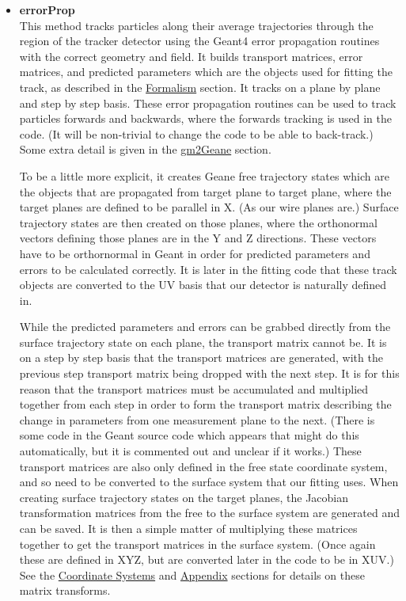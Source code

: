 \begin{enumerate}
\begin{itemize}
          \item{\bf{errorProp}} \\ 
          This method tracks particles along their average trajectories through the region of the tracker detector using the Geant4 error propagation routines with the correct geometry and field. It builds transport matrices, error matrices, and predicted parameters which are the objects used for fitting the track, as described in the \hyperref[sec:Formalism]{Formalism} section. It tracks on a plane by plane and step by step basis. These error propagation routines can be used to track particles forwards and backwards, where the forwards tracking is used in the code. (It will be non-trivial to change the code to be able to back-track.) Some extra detail is given in the \hyperref[sec:gm2Geane]{gm2Geane} section.

          To be a little more explicit, it creates Geane free trajectory states which are the objects that are propagated from target plane to target plane, where the target planes are defined to be parallel in X. (As our wire planes are.) Surface trajectory states are then created on those planes, where the orthonormal vectors defining those planes are in the Y and Z directions. These vectors have to be orthornormal in Geant in order for predicted parameters and errors to be calculated correctly. It is later in the fitting code that these track objects are converted to the UV basis that our detector is naturally defined in. 
            
          While the predicted parameters and errors can be grabbed directly from the surface trajectory state on each plane, the transport matrix cannot be. It is on a step by step basis that the transport matrices are generated, with the previous step transport matrix being dropped with the next step. It is for this reason that the transport matrices must be accumulated and multiplied together from each step in order to form the transport matrix describing the change in parameters from one measurement plane to the next. (There is some code in the Geant source code which appears that might do this automatically, but it is commented out and unclear if it works.) These transport matrices are also only defined in the free state coordinate system, and so need to be converted to the surface system that our fitting uses. When creating surface trajectory states on the target planes, the Jacobian transformation matrices from the free to the surface system are generated and can be saved. It is then a simple matter of multiplying these matrices together to get the transport matrices in the surface system. (Once again these are defined in XYZ, but are converted later in the code to be in XUV.) See the \hyperref[sec:Coord]{Coordinate Systems} and \hyperref[sec:MatTransf]{Appendix} sections for details on these matrix transforms.


\end{itemize}
\end{enumerate}
